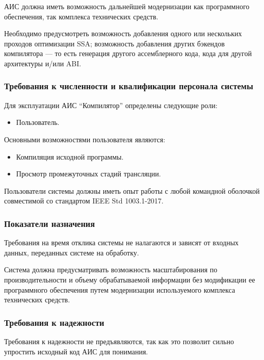 \documentclass[14pt,russian]{extarticle}
\begin{document}
АИС должна иметь возможность дальнейшей модернизации как программного
обеспечения, так комплекса технических средств.

Необходимо предусмотреть возможность добавления одного или нескольких проходов
оптимизации SSA; возможность добавления других бэкендов компилятора --- то есть
генерация другого ассемблерного кода, кода для другой архитектуры и/или ABI.

\subsubsection{Требования к численности и квалификации персонала системы}

Для эксплуатации АИС \enquote{Компилятор} определены следующие роли:

\begin{itemize}
	\item Пользователь.
\end{itemize}

Основными возможностями пользователя являются:

\begin{itemize}
	\item Компиляция исходной программы.
	\item Просмотр промежуточных стадий трансляции.
\end{itemize}

Пользователи системы должны иметь опыт работы с любой командной оболочкой совместимой со стандартом IEEE Std 1003.1-2017.

\subsubsection{Показатели назначения}

Требования на время отклика системы не налагаются и зависят от входных данных,
переданных системе на обработку.

Система должна предусматривать возможность масштабирования по производительности
и объему обрабатываемой информации без модификации ее программного обеспечения
путем модернизации используемого комплекса технических средств.

\subsubsection{Требования к надежности}

Требования к надежности не предъявляются, так как это позволит сильно упростить
исходный код АИС для понимания.
\end{document}
